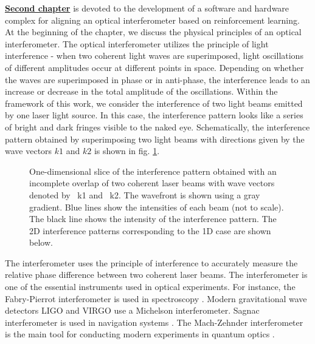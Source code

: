 \underline{\textbf{Second chapter}} is devoted to the development of a software and hardware complex for aligning an optical interferometer based on reinforcement learning. At the beginning of the chapter, we discuss the physical principles of an optical interferometer. The optical interferometer utilizes the principle of light interference - when two coherent light waves are superimposed, light oscillations of different amplitudes occur at different points in space. Depending on whether the waves are superimposed in phase or in anti-phase, the interference leads to an increase or decrease in the total amplitude of the oscillations. Within the framework of this work, we consider the interference of two light beams emitted by one laser light source. In this case, the interference pattern looks like a series of bright and dark fringes visible to the naked eye. Schematically, the interference pattern obtained by superimposing two light beams with directions given by the wave vectors $k1$ and $k2$ is shown in fig. \ref{fig:two_beam_interf}.

\begin{figure}[ht]
    \caption{
    One-dimensional slice of the interference pattern obtained with an incomplete overlap of two coherent laser beams with wave vectors denoted by ~k1 and ~k2. The wavefront is shown using a gray gradient. Blue lines show the intensities of each beam (not to scale). The black line shows the intensity of the interference pattern. The 2D interference patterns corresponding to the 1D case are shown below.}
\label{fig:two_beam_interf}
\end{figure}

The interferometer uses the principle of interference to accurately measure the relative phase difference between two coherent laser beams. The interferometer is one of the essential instruments used in optical experiments. For instance, the Fabry-Pierrot interferometer is used in spectroscopy \cite{fabry-perot1899}. Modern gravitational wave detectors LIGO and VIRGO \cite{LIGO, VIRGO} use a Michelson interferometer. Sagnac interferometer is used in navigation systems \cite{Kandpal2000}. The Mach-Zehnder interferometer is the main tool for conducting modern experiments in quantum optics \cite{Ourjoumtsev2006, Sychev2017}.


